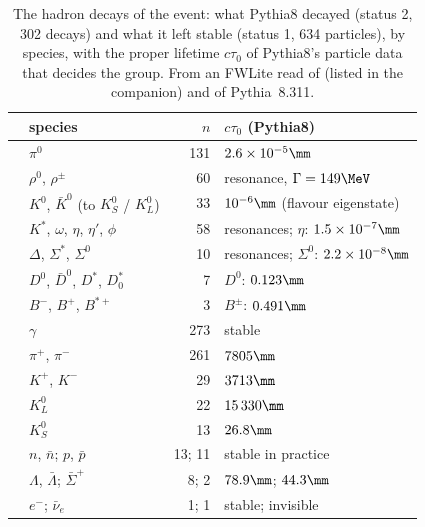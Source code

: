 \begin{table}[htbp]
\centering\small
\caption{The hadron decays of the event: what Pythia8 decayed (status 2, 302 decays) and what it left stable
(status 1, 634 particles), by species, with the proper lifetime $c\tau_0$ of Pythia8's particle data that decides
the group. From an FWLite read of  (listed in the companion) and
 of Pythia~8.311.}
\label{tab:06_who}
\begin{tabular}{@{}llrl@{}}
\toprule
 & species & $n$ & $c\tau_0$ (Pythia8) \\
\midrule
{}
 & $\pi^0$ & 131 & $2.6\times10^{-5}\mm$ \\
 & $\rho^0$, $\rho^\pm$ & 60 & resonance, $\Gamma = 149\MeV$ \\
 & $K^0$, $\bar{K}^0$ (to $K^0_S$ / $K^0_L$) & 33 & $10^{-6}\mm$ (flavour eigenstate) \\
 & $K^{*}$, $\omega$, $\eta$, $\eta'$, $\phi$ & 58 & resonances; $\eta$: $1.5\times10^{-7}\mm$ \\
 & $\Delta$, $\Sigma^*$, $\Sigma^0$ & 10 & resonances; $\Sigma^0$: $2.2\times10^{-8}\mm$ \\
 & $D^0$, $\bar{D}^0$, $D^{*}$, $D^*_0$ & 7 & $D^0$: $0.123\mm$ \\
 & $B^-$, $B^+$, $B^{*+}$ & 3 & $B^\pm$: $0.491\mm$ \\
\midrule
{}
 & $\gamma$ & 273 & stable \\
 & $\pi^+$, $\pi^-$ & 261 & $7805\mm$ \\
 & $K^+$, $K^-$ & 29 & $3713\mm$ \\
 & $K^0_L$ & 22 & $15\,330\mm$ \\
 & $K^0_S$ & 13 & $26.8\mm$ \\
 & $n$, $\bar{n}$; $p$, $\bar{p}$ & 13; 11 & stable in practice \\
 & $\Lambda$, $\bar{\Lambda}$; $\bar{\Sigma}^+$ & 8; 2 & $78.9\mm$; $44.3\mm$ \\
 & $e^-$; $\bar{\nu}_e$ & 1; 1 & stable; invisible \\
\bottomrule
\end{tabular}
\end{table}

